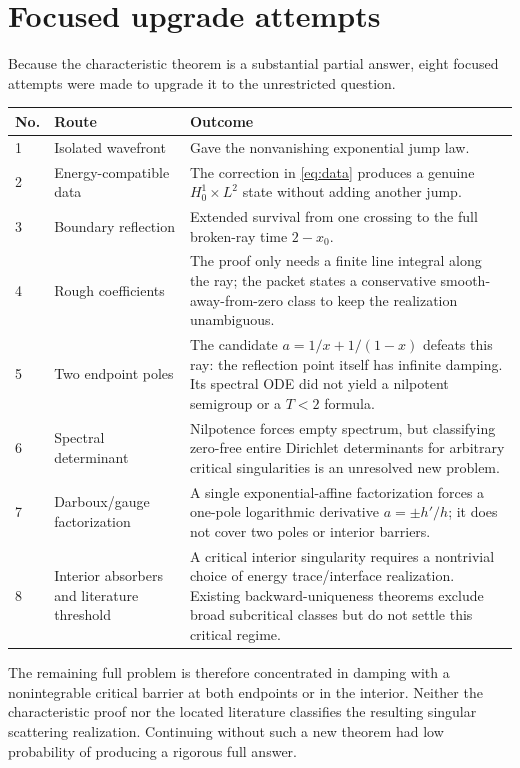 \documentclass[11pt]{article}
\begin{document}
\section{Focused upgrade attempts}

Because the characteristic theorem is a substantial partial answer, eight
focused attempts were made to upgrade it to the unrestricted question.

\begin{center}
\small
\begin{tabular}{@{}p{}p{}p{}@{}}
\toprule
No. & Route & Outcome \\
\midrule
1 & Isolated wavefront & Gave the nonvanishing exponential jump law. \\
2 & Energy-compatible data & The correction in \eqref{eq:data} produces a genuine $H^1_0\times L^2$ state without adding another jump. \\
3 & Boundary reflection & Extended survival from one crossing to the full broken-ray time $2-x_0$. \\
4 & Rough coefficients & The proof only needs a finite line integral along the ray; the packet states a conservative smooth-away-from-zero class to keep the realization unambiguous. \\
5 & Two endpoint poles & The candidate $a=1/x+1/(1-x)$ defeats this ray: the reflection point itself has infinite damping.  Its spectral ODE did not yield a nilpotent semigroup or a $T<2$ formula. \\
6 & Spectral determinant & Nilpotence forces empty spectrum, but classifying zero-free entire Dirichlet determinants for arbitrary critical singularities is an unresolved new problem. \\
7 & Darboux/gauge factorization & A single exponential-affine factorization forces a one-pole logarithmic derivative $a=\pm h'/h$; it does not cover two poles or interior barriers. \\
8 & Interior absorbers and literature threshold & A critical interior singularity requires a nontrivial choice of energy trace/interface realization.  Existing backward-uniqueness theorems exclude broad subcritical classes but do not settle this critical regime. \\
\bottomrule
\end{tabular}
\end{center}

The remaining full problem is therefore concentrated in damping with a
nonintegrable critical barrier at both endpoints or in the interior.  Neither
the characteristic proof nor the located literature classifies the resulting
singular scattering realization.  Continuing without such a new theorem had
low probability of producing a rigorous full answer.
\end{document}
